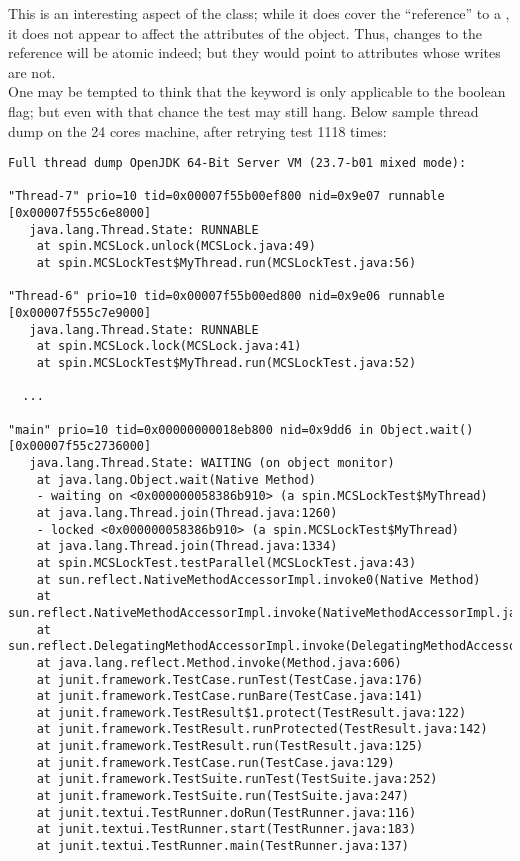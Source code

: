 This is an interesting aspect of the  class; while
it does cover the ``reference'' to a , it does not
appear to affect the attributes of the object. Thus, changes to the
 reference will be atomic indeed; but they would point to
attributes whose writes are not. \\

One may be tempted to think that the  keyword is only
applicable to the  boolean flag; but even with that chance
the test may still hang. Below sample thread dump on the 24 cores
machine, after retrying test 1118 times: \\

\begin{verbatim}
Full thread dump OpenJDK 64-Bit Server VM (23.7-b01 mixed mode):

"Thread-7" prio=10 tid=0x00007f55b00ef800 nid=0x9e07 runnable [0x00007f555c6e8000]
   java.lang.Thread.State: RUNNABLE
	at spin.MCSLock.unlock(MCSLock.java:49)
	at spin.MCSLockTest$MyThread.run(MCSLockTest.java:56)

"Thread-6" prio=10 tid=0x00007f55b00ed800 nid=0x9e06 runnable [0x00007f555c7e9000]
   java.lang.Thread.State: RUNNABLE
	at spin.MCSLock.lock(MCSLock.java:41)
	at spin.MCSLockTest$MyThread.run(MCSLockTest.java:52)

  ...

"main" prio=10 tid=0x00000000018eb800 nid=0x9dd6 in Object.wait() [0x00007f55c2736000]
   java.lang.Thread.State: WAITING (on object monitor)
	at java.lang.Object.wait(Native Method)
	- waiting on <0x000000058386b910> (a spin.MCSLockTest$MyThread)
	at java.lang.Thread.join(Thread.java:1260)
	- locked <0x000000058386b910> (a spin.MCSLockTest$MyThread)
	at java.lang.Thread.join(Thread.java:1334)
	at spin.MCSLockTest.testParallel(MCSLockTest.java:43)
	at sun.reflect.NativeMethodAccessorImpl.invoke0(Native Method)
	at sun.reflect.NativeMethodAccessorImpl.invoke(NativeMethodAccessorImpl.java:57)
	at sun.reflect.DelegatingMethodAccessorImpl.invoke(DelegatingMethodAccessorImpl.java:43)
	at java.lang.reflect.Method.invoke(Method.java:606)
	at junit.framework.TestCase.runTest(TestCase.java:176)
	at junit.framework.TestCase.runBare(TestCase.java:141)
	at junit.framework.TestResult$1.protect(TestResult.java:122)
	at junit.framework.TestResult.runProtected(TestResult.java:142)
	at junit.framework.TestResult.run(TestResult.java:125)
	at junit.framework.TestCase.run(TestCase.java:129)
	at junit.framework.TestSuite.runTest(TestSuite.java:252)
	at junit.framework.TestSuite.run(TestSuite.java:247)
	at junit.textui.TestRunner.doRun(TestRunner.java:116)
	at junit.textui.TestRunner.start(TestRunner.java:183)
	at junit.textui.TestRunner.main(TestRunner.java:137)
\end{verbatim}
\hfill


